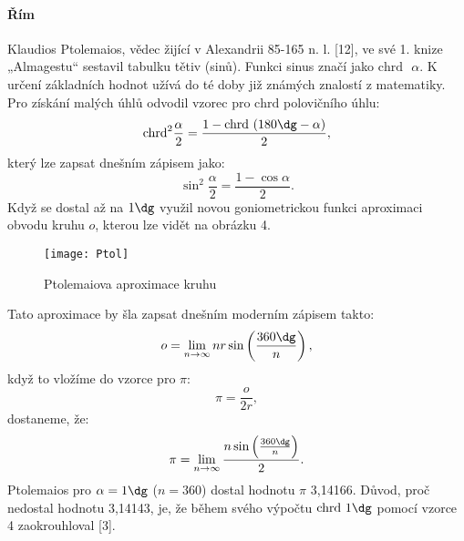 \documentclass[rocnikovka]{gzwroc} %
\begin{document}
\paragraph{Řím}
Klaudios Ptolemaios, vědec žijící v Alexandrii 85-165 n. l. [12], ve své 1. knize „Almagestu“ sestavil tabulku tětiv (sinů). Funkci sinus značí jako $\mathrm{chrd} \textrm{ }\alpha$. K určení základních hodnot užívá do té doby již známých znalostí z matematiky. Pro získání malých úhlů odvodil vzorec pro $\mathrm{chrd}$ polovičního úhlu:
$$
\mathrm{chrd}^2\frac{\alpha}{2}=\frac{1-\mathrm{chrd}\textrm{ }(180\dg-\alpha)}{2},
$$
který lze zapsat dnešním zápisem jako:
\begin{equation}
\sin^2\frac{\alpha}{2}=\frac{1-\cos\alpha}{2}.
\end{equation}
Když se dostal až na  $1\dg$ využil novou goniometrickou funkci aproximaci obvodu kruhu $o$, kterou lze vidět na obrázku 4.
\begin{figure}[!ht]
\texttt{[image: Ptol]}
\caption{Ptolemaiova aproximace kruhu}
\label{fig:kruh}
\end{figure}
Tato aproximace by šla zapsat dnešním moderním zápisem takto:
$$
o=\lim_{n\to\infty} nr\sin\left(\frac{360\dg}{n}\right),
$$
když to  vložíme do vzorce pro $\pi$:
$$
\pi=\frac{o}{2r},
$$
dostaneme, že:
\begin{equation}
\pi=\lim_{n\to\infty}\frac{n\sin\left(\frac{360\dg}{n}\right)}{2}.
\end{equation}
Ptolemaios pro $\alpha = 1\dg$ ($n=360$) dostal hodnotu $\pi$ 3,14166. Důvod, proč nedostal hodnotu 3,14143, je, že během svého výpočtu $\mathrm{chrd} \textrm{ }1\dg$ pomocí vzorce 4 zaokrouhloval [3].
\end{document}
